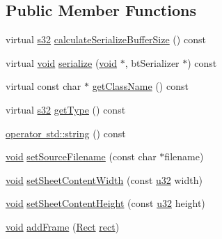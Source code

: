 \subsection*{Public Member Functions}
\begin{DoxyCompactItemize}
\item 
virtual \mbox{\hyperlink{_util_8h_aa62c75d314a0d1f37f79c4b73b2292e2}{s32}} \mbox{\hyperlink{classnjli_1_1_sprite_frame_atlas_acaa7d503f10f50c8c02d00a5d452d704}{calculate\+Serialize\+Buffer\+Size}} () const
\item 
virtual \mbox{\hyperlink{_thread_8h_af1e856da2e658414cb2456cb6f7ebc66}{void}} \mbox{\hyperlink{classnjli_1_1_sprite_frame_atlas_a6eb5c74fba5bfbe51278d58eee374922}{serialize}} (\mbox{\hyperlink{_thread_8h_af1e856da2e658414cb2456cb6f7ebc66}{void}} $\ast$, bt\+Serializer $\ast$) const
\item 
virtual const char $\ast$ \mbox{\hyperlink{classnjli_1_1_sprite_frame_atlas_a8c65d9841be00711e2313fab7b356fbd}{get\+Class\+Name}} () const
\item 
virtual \mbox{\hyperlink{_util_8h_aa62c75d314a0d1f37f79c4b73b2292e2}{s32}} \mbox{\hyperlink{classnjli_1_1_sprite_frame_atlas_a65d153f3e642f3fc07c8cd428bcedf19}{get\+Type}} () const
\item 
\mbox{\hyperlink{classnjli_1_1_sprite_frame_atlas_a21d364411123d55f6dc3e0ee37c30c3c}{operator std\+::string}} () const
\item 
\mbox{\hyperlink{_thread_8h_af1e856da2e658414cb2456cb6f7ebc66}{void}} \mbox{\hyperlink{classnjli_1_1_sprite_frame_atlas_acdb8abdcb12a78faaba9bc8bb03b1813}{set\+Source\+Filename}} (const char $\ast$filename)
\item 
\mbox{\hyperlink{_thread_8h_af1e856da2e658414cb2456cb6f7ebc66}{void}} \mbox{\hyperlink{classnjli_1_1_sprite_frame_atlas_a13cf0c784936ff97ddffbce245df1c9c}{set\+Sheet\+Content\+Width}} (const \mbox{\hyperlink{_util_8h_a10e94b422ef0c20dcdec20d31a1f5049}{u32}} width)
\item 
\mbox{\hyperlink{_thread_8h_af1e856da2e658414cb2456cb6f7ebc66}{void}} \mbox{\hyperlink{classnjli_1_1_sprite_frame_atlas_a3ad6be6edaad4035f39bc4f2f992d424}{set\+Sheet\+Content\+Height}} (const \mbox{\hyperlink{_util_8h_a10e94b422ef0c20dcdec20d31a1f5049}{u32}} height)
\item 
\mbox{\hyperlink{_thread_8h_af1e856da2e658414cb2456cb6f7ebc66}{void}} \mbox{\hyperlink{classnjli_1_1_sprite_frame_atlas_a029155ea70b98a96833a1c27d6ce530a}{add\+Frame}} (\mbox{\hyperlink{classnjli_1_1_rect}{Rect}} \mbox{\hyperlink{classnjli_1_1_sprite_frame_atlas_a85cbbab899666861a829c1cb06a03f87}{rect}})

\end{DoxyCompactItemize}
